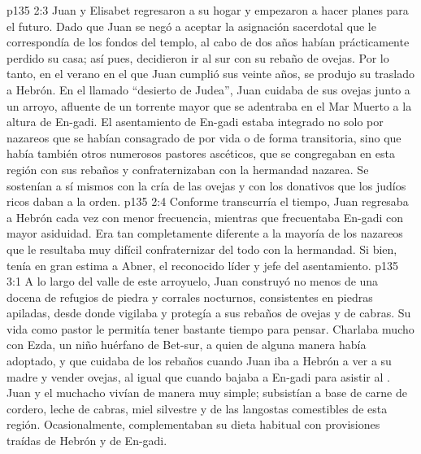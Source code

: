 \vs p135 2:3 Juan y Elisabet regresaron a su hogar y empezaron a hacer planes para el futuro. Dado que Juan se negó a aceptar la asignación sacerdotal que le correspondía de los fondos del templo, al cabo de dos años habían prácticamente perdido su casa; así pues, decidieron ir al sur con su rebaño de ovejas. Por lo tanto, en el verano en el que Juan cumplió sus veinte años, se produjo su traslado a Hebrón. En el llamado “desierto de Judea”, Juan cuidaba de sus ovejas junto a un arroyo, afluente de un torrente mayor que se adentraba en el Mar Muerto a la altura de En\hyp{}gadi. El asentamiento de En\hyp{}gadi estaba integrado no solo por nazareos que se habían consagrado de por vida o de forma transitoria, sino que había también otros numerosos pastores ascéticos, que se congregaban en esta región con sus rebaños y confraternizaban con la hermandad nazarea. Se sostenían a sí mismos con la cría de las ovejas y con los donativos que los judíos ricos daban a la orden.
\vs p135 2:4 Conforme transcurría el tiempo, Juan regresaba a Hebrón cada vez con menor frecuencia, mientras que frecuentaba En\hyp{}gadi con mayor asiduidad. Era tan completamente diferente a la mayoría de los nazareos que le resultaba muy difícil confraternizar del todo con la hermandad. Si bien, tenía en gran estima a Abner, el reconocido líder y jefe del asentamiento.
\vs p135 3:1 A lo largo del valle de este arroyuelo, Juan construyó no menos de una docena de refugios de piedra y corrales nocturnos, consistentes en piedras apiladas, desde donde vigilaba y protegía a sus rebaños de ovejas y de cabras. Su vida como pastor le permitía tener bastante tiempo para pensar. Charlaba mucho con Ezda, un niño huérfano de Bet\hyp{}sur, a quien de alguna manera había adoptado, y que cuidaba de los rebaños cuando Juan iba a Hebrón a ver a su madre y vender ovejas, al igual que cuando bajaba a En\hyp{}gadi para asistir al . Juan y el muchacho vivían de manera muy simple; subsistían a base de carne de cordero, leche de cabras, miel silvestre y de las langostas comestibles de esta región. Ocasionalmente, complementaban su dieta habitual con provisiones traídas de Hebrón y de En\hyp{}gadi.
